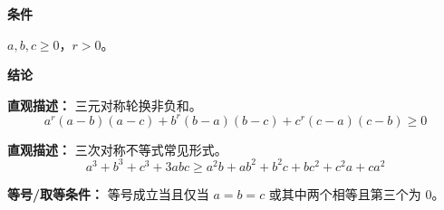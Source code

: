 \begin{statementbox}

\textbf{\textcolor{CStatement}{条件}}
\begin{description}[style=nextline, leftmargin=2.8em, labelsep=0.5em, itemsep=0.35em]
    \item[\textbf{\textcolor{CStatement}{条件 1（非负实数与正指数）：}}] $a, b, c \geq 0$，$r > 0$。
\end{description}

\textbf{\textcolor{CStatement}{结论}}
\begin{description}[style=nextline, leftmargin=2.8em, labelsep=0.5em, itemsep=0.45em]
    \item[\textbf{\textcolor{CStatement}{结论一（舒尔不等式）：}}]
    \textbf{\textcolor{CStatement}{直观描述：}} 三元对称轮换非负和。
    \[
    a^{r}(a-b)(a-c) + b^{r}(b-a)(b-c) + c^{r}(c-a)(c-b) \geq 0
    \]

    \item[\textbf{\textcolor{CStatement}{推广结论（三次舒尔）：}}]
    \textbf{\textcolor{CStatement}{直观描述：}} 三次对称不等式常见形式。
    \[
    a^{3}+b^{3}+c^{3}+3abc \geq a^{2}b+ab^{2}+b^{2}c+bc^{2}+c^{2}a+ca^{2}
    \]
\end{description}

\textbf{\textcolor{CStatement}{等号/取等条件：}} 等号成立当且仅当 $a = b = c$ 或其中两个相等且第三个为 $0$。

\end{statementbox}
